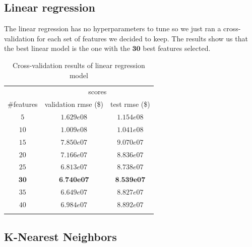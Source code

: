 
\subsection{Linear regression}

The linear regression has no hyperparameters to tune so we just ran a cross-validation for each set of features we decided to keep. The results show us that the best linear model is the one with the $\textbf{30}$ best features selected.

\begin{table}[H]
	\centering
	\begin{tabular}{ccc} \toprule
	  & \multicolumn {2}{c}{scores} \\\cmidrule(lr) {2-3}
	  \#features         & validation rmse (\$)             & test rmse (\$) \\\hline
	  $5$        		& $1.629e08$                      	& $1.154e08$ \\
	  $10$        		& $1.009e08$                        & $1.041e08$ \\
	  $15$        		& $7.850e07$                        & $9.070e07$ \\
	  $20$             	& $7.166e07$                        & $8.836e07$ \\
	  $25$             	& $6.813e07$                        & $8.738e07$ \\
	  $\textbf{30}$     & $\textbf{6.740e07}$               & $\textbf{8.539e07}$ \\
	  $35$             	& $6.649e07$                        & $8.827e07$ \\
	  $40$             	& $6.984e07$                        & $8.892e07$ \\
	  \\\hline
	\end{tabular}
	\caption{Cross-validation results of linear regression model}
	\label{tab:linear-regression-results}
\end{table}

\subsection{K-Nearest Neighbors}

